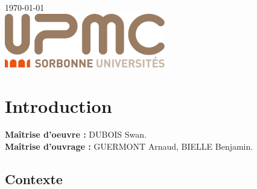 \documentclass[a4paper,8pt]{report}
\begin{document}
\begin{titlepage}

{\large \today}\\[3cm] %


\includegraphics[width=7cm]{images/upmc.png}\\[1cm] %
 

\vfill %
\end{titlepage}

\renewcommand{\contentsname}{Sommaire}
\tableofcontents
\listoffigures

\chapter{Introduction}

\noindent \textbf{Ma\^itrise d'oeuvre :} DUBOIS Swan.\\
\noindent \textbf{Ma\^itrise d'ouvrage :} GUERMONT Arnaud, BIELLE Benjamin.\\

\section*{Contexte}\label{sec:name}
\end{document}
